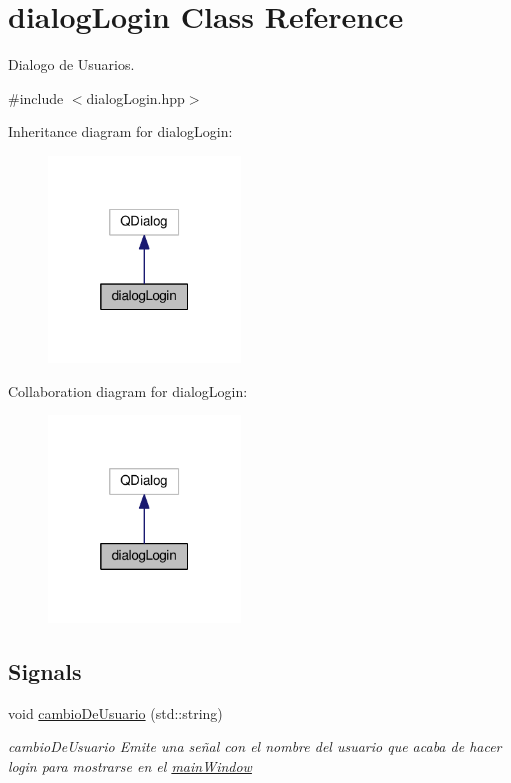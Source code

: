 \hypertarget{classdialogLogin}{}\section{dialog\+Login Class Reference}
\label{classdialogLogin}


Dialogo de Usuarios.  




{\ttfamily \#include $<$dialog\+Login.\+hpp$>$}



Inheritance diagram for dialog\+Login\+:
\nopagebreak
\begin{figure}[H]
\begin{center}
\leavevmode
\includegraphics[width=145pt]{classdialogLogin__inherit__graph}
\end{center}
\end{figure}


Collaboration diagram for dialog\+Login\+:
\nopagebreak
\begin{figure}[H]
\begin{center}
\leavevmode
\includegraphics[width=145pt]{classdialogLogin__coll__graph}
\end{center}
\end{figure}
\subsection*{Signals}
\begin{DoxyCompactItemize}
\item 
\hypertarget{classdialogLogin_a051d47d5652799fb46105756e30d60a4}{}void \hyperlink{classdialogLogin_a051d47d5652799fb46105756e30d60a4}{cambio\+De\+Usuario} (std\+::string)\label{classdialogLogin_a051d47d5652799fb46105756e30d60a4}

\begin{DoxyCompactList}\small\item\em cambio\+De\+Usuario Emite una señal con el nombre del usuario que acaba de hacer login para mostrarse en el \hyperlink{classmainWindow}{main\+Window} \end{DoxyCompactList}\end{DoxyCompactItemize}
